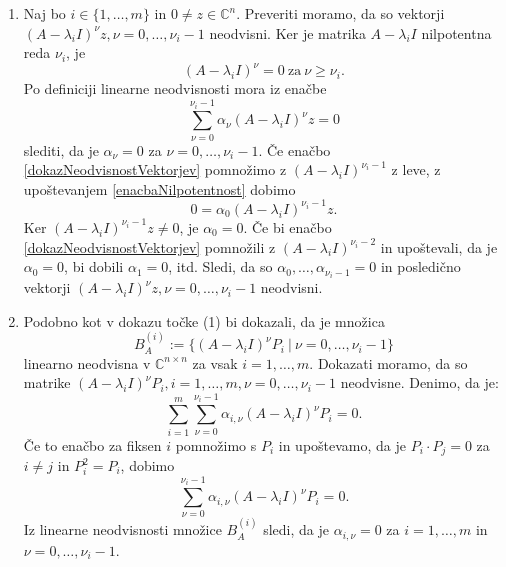 \documentclass[mat1]{fmfdelo}
\newcommand{\C}{\mathbb C}
\begin{document}
\begin{dokaz}
    \begin{enumerate}
        \item Naj bo $i \in \{1, \ldots, m\}$ in $0 \neq z \in \C^n$. Preveriti moramo, da so vektorji $(A - \lambda_i I)^\nu z, \nu = 0, \ldots, \nu_i-1$ neodvisni. Ker je matrika $A - \lambda_i I$ nilpotentna reda $\nu_i$, je
        \begin{equation}\label{enacbaNilpotentnost}
            (A - \lambda_i I)^\nu = 0\ \text{za}\ \nu \geq \nu_i.
        \end{equation}
        Po definiciji linearne neodvisnosti mora iz enačbe
        \begin{equation}\label{dokazNeodvisnostVektorjev}
            \sum_{\nu = 0}^{\nu_i - 1} \alpha_\nu (A - \lambda_i I)^\nu z = 0
        \end{equation}
        slediti, da je $\alpha_\nu = 0$ za $\nu = 0, \ldots, \nu_i-1$. Če enačbo \eqref{dokazNeodvisnostVektorjev} pomnožimo z $(A - \lambda_i I)^{\nu_i-1}$ z leve, z upoštevanjem \eqref{enacbaNilpotentnost} dobimo
        \begin{equation*}
            0 = \alpha_0 (A-\lambda_i I)^{\nu_i-1} z.
        \end{equation*}
        Ker $(A-\lambda_i I)^{\nu_i-1} z \neq 0$, je $\alpha_0 = 0$. Če bi enačbo \eqref{dokazNeodvisnostVektorjev} pomnožili z $(A - \lambda_i I)^{\nu_i-2}$ in upoštevali, da je $\alpha_0 = 0$, bi dobili $\alpha_1 = 0$, itd. Sledi, da so $\alpha_0, \ldots, \alpha_{\nu_i - 1} = 0$ in posledično vektorji $(A - \lambda_i I)^\nu z, \nu = 0, \ldots, \nu_i-1$ neodvisni.

        \item Podobno kot v dokazu točke (1) bi dokazali, da je množica
        \begin{equation*}
            B_A^{(i)} := \{(A-\lambda_i I)^\nu P_i\ |\ \nu = 0, \ldots, \nu_i-1\}
        \end{equation*}
        linearno neodvisna v $\C^{n \times n}$ za vsak $i = 1, \ldots, m$. Dokazati moramo, da so matrike $(A-\lambda_i I)^{\nu} P_i, i = 1, \ldots, m, \nu = 0, \ldots, \nu_i-1$ neodvisne. Denimo, da je:
        \begin{equation*}
            \sum_{i=1}^m \sum_{\nu=0}^{\nu_i-1} \alpha_{i, \nu} (A-\lambda_i I)^{\nu} P_i = 0.
        \end{equation*}
        Če to enačbo za fiksen $i$ pomnožimo s $P_i$ in upoštevamo, da je $P_i \cdot P_j = 0$ za $i \neq j$ in $P_i^2 = P_i$, dobimo
        \begin{equation*}
            \sum_{\nu = 0}^{\nu_i - 1} \alpha_{i, \nu} (A-\lambda_i I)^{\nu} P_i = 0.
        \end{equation*}
        Iz linearne neodvisnosti množice $B_A^{(i)}$ sledi, da je $\alpha_{i, \nu} = 0$ za $i = 1, \ldots, m$ in $\nu = 0, \ldots, \nu_i-1$.
    \end{enumerate}
\end{dokaz}
\end{document}
